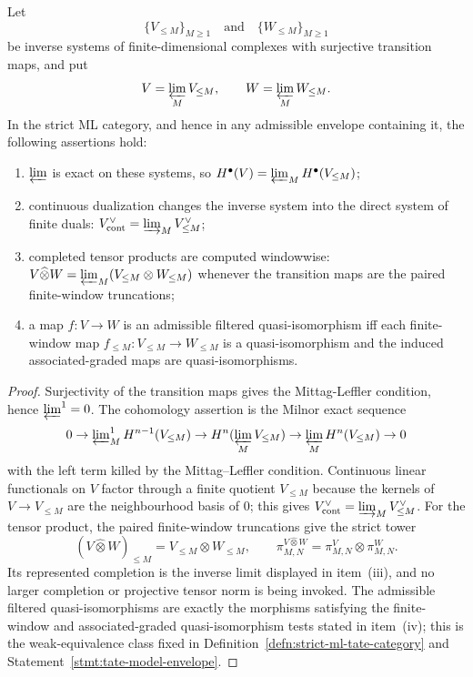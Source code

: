 \begin{lem}
\label{lem:tate-mittag-leffler-dictionary}
  Let
  \[
    \{V_{\leq M}\}_{M\geq1}
    \quad\text{and}\quad
    \{W_{\leq M}\}_{M\geq1}
  \]
  be inverse systems of finite-dimensional complexes with surjective
  transition maps, and put
  \[
    V=\varprojlim_MV_{\leq M},\qquad
    W=\varprojlim_MW_{\leq M}.
  \]
  In the strict ML category, and hence in any admissible envelope
  containing it, the following assertions hold:
  \begin{enumerate}[label=(\roman*)]
    \item \(\varprojlim\) is exact on these systems, so
      \(H^\bullet(V)=\varprojlim_MH^\bullet(V_{\leq M})\);
    \item continuous dualization changes the inverse system into the
      direct system of finite duals:
      \(V^\vee_{\mathrm{cont}}=\varinjlim_MV_{\leq M}^\vee\);
    \item completed tensor products are computed windowwise:
      \(V\widehat\otimes W
        =\varprojlim_M(V_{\leq M}\otimes W_{\leq M})\) whenever the
      transition maps are the paired finite-window truncations;
    \item a map \(f\colon V\to W\) is an admissible filtered
      quasi-isomorphism iff each finite-window map
      \(f_{\leq M}\colon V_{\leq M}\to W_{\leq M}\) is a
      quasi-isomorphism and the induced associated-graded maps are
      quasi-isomorphisms.
  \end{enumerate}
\end{lem}

\begin{proof}
  Surjectivity of the transition maps gives the Mittag-Leffler
  condition, hence \(\varprojlim^1=0\).  The cohomology assertion is
  the Milnor exact sequence
  \[
    0\to \varprojlim\nolimits^1_M H^{n-1}(V_{\leq M})
      \to H^n(\varprojlim_M V_{\leq M})
      \to \varprojlim_M H^n(V_{\leq M})\to 0
  \]
  with the left term killed by the Mittag--Leffler condition.
  Continuous linear functionals on \(V\) factor through a finite quotient
  \(V_{\leq M}\) because the kernels of \(V\to V_{\leq M}\) are the
  neighbourhood basis of \(0\); this gives
  \(V^\vee_{\mathrm{cont}}=\varinjlim_MV_{\leq M}^\vee\).  For the tensor
  product, the paired finite-window truncations give the strict tower
  \[
    (V\widehat\otimes W)_{\leq M}
      =V_{\leq M}\otimes W_{\leq M},\qquad
    \pi^{V\widehat\otimes W}_{M,N}
      =\pi^V_{M,N}\otimes\pi^W_{M,N}.
  \]
  Its represented completion is the inverse limit displayed in
  item~(iii), and no larger completion or projective tensor norm is being
  invoked.  The admissible filtered quasi-isomorphisms are exactly the
  morphisms satisfying the finite-window and associated-graded
  quasi-isomorphism tests stated in item~(iv); this is the weak-equivalence
  class fixed in Definition~\ref{defn:strict-ml-tate-category} and
  Statement~\ref{stmt:tate-model-envelope}.
\end{proof}

